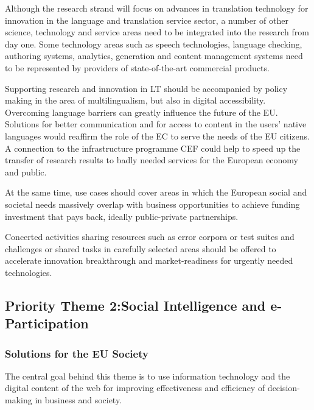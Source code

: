 \documentclass[10pt, plain]{../../metanetpaper}
\begin{document}
\begin{multicols}{2}
Although the research strand will focus on advances in translation technology for innovation in the language and translation service sector, a number of other science, technology and service areas need to be integrated into the research from day one. Some technology areas such as speech technologies, language checking, authoring systems, analytics, generation and content management systems need to be represented by providers of state-of-the-art commercial products.
 
Supporting research and innovation in LT should be accompanied by policy making in the area of multilingualism, but also in digital accessibility. Overcoming language barriers can greatly influence the future of the EU. Solutions for better communication and for access to content in the users' native languages would reaffirm the role of the EC to serve the needs of the EU citizens. A connection to the infrastructure programme CEF could help to speed up the transfer of research results to badly needed services for the European economy and public.

At the same time, use cases should cover areas in which the European social and societal needs massively overlap with business opportunities to achieve funding investment that pays back, ideally public-private partnerships.
 
Concerted activities sharing resources such as error corpora or test suites and challenges or shared tasks in carefully selected areas should be offered to accelerate innovation breakthrough and market-readiness for urgently needed technologies.

\subsection[Priority Theme 2: Social Intelligence and e-Participation]{Priority Theme 2:\newline Social Intelligence and e-Participation}
\label{sec:priority-theme-2-social-intelligence}

\subsubsection{Solutions for the EU Society}
\label{sec:solutions-eu-society-pt2}

The central goal behind this theme is to use information technology and the digital content of the web for improving effectiveness and efficiency of decision-making in business and society. 
 

\end{multicols}
\end{document}
